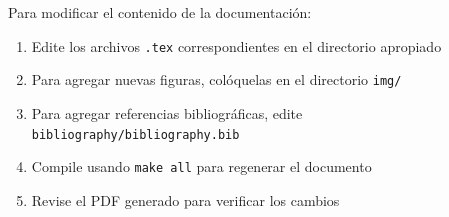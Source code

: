Para modificar el contenido de la documentación:

\begin{enumerate}
    \item Edite los archivos \texttt{.tex} correspondientes en el directorio apropiado
    \item Para agregar nuevas figuras, colóquelas en el directorio \texttt{img/}
    \item Para agregar referencias bibliográficas, edite \texttt{bibliography/bibliography.bib}
    \item Compile usando \texttt{make all} para regenerar el documento
    \item Revise el PDF generado para verificar los cambios
\end{enumerate}



